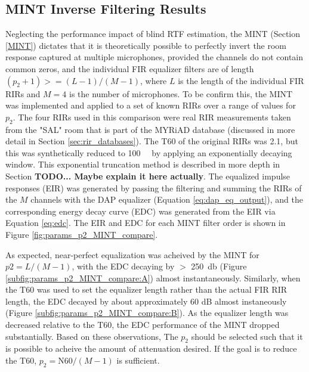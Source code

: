 \subsection{MINT Inverse Filtering Results} \label{section:params_p2_MINT} 

Neglecting the performance impact of blind RTF estimation, the MINT (Section \ref{MINT}) dictates that it is theoretically possible to perfectly invert the room response captured at multiple microphones, provided the channels do not contain common zeros, and the individual FIR equalizer filters are of length $\left(p_2+1\right) >= \left(L-1\right) / \left(M-1\right)$, where $L$ is the length of the individual FIR RIRs and $M=4$ is the number of microphones. To be confirm this, the MINT was implemented and applied to a set of known RIRs over a range of values for $p_2$. The four RIRs used in this comparison were real RIR measurements taken from the "SAL" room that is part of the MYRiAD database \citep{dietzen2023myriad} (discussed in more detail in Section \ref{sec:rir_databases}). The T60 of the original RIRs was \qty{2.1}{\sec}, but this was synthetically reduced to \qty{100}{\milli\sec} by applying an exponentially decaying window. This exponential truncation method is described in more depth in Section \textbf{TODO... Maybe explain it here actually}. The equalized impulse responses (EIR) was generated by passing the filtering and summing the RIRs of the $M$ channels with the DAP equalizer (Equation \ref{eq:dap_eq_output}), and the corresponding energy decay curve (EDC) was generated from the EIR via Equation \ref{eq:edc}. The EIR and EDC for each MINT filter order is shown in Figure \ref{fig:params_p2_MINT_compare}.

As expected, near-perfect equalization was acheived by the MINT for $p2 = L / \left(M-1\right)$, with the EDC decaying by $>$ \qty{250}{\decibel} (Figure \ref{subfig:params_p2_MINT_compare:A}) almost instantaneously. Similarly, when the T60 was used to set the equalizer length rather than the actual FIR RIR length, the EDC decayed by about approximately 60 dB almost instaneously (Figure \ref{subfig:params_p2_MINT_compare:B}). As the equalizer length was decreased relative to the T60, the EDC performance of the MINT dropped substantially. Based on these observations, The $p_2$ should be selected such that it is possible to acheive the amount of attenuation desired. If the goal is to reduce the T60, $p_2 = \mathrm{N60}  / \left(M-1 \right)$ is sufficient.


